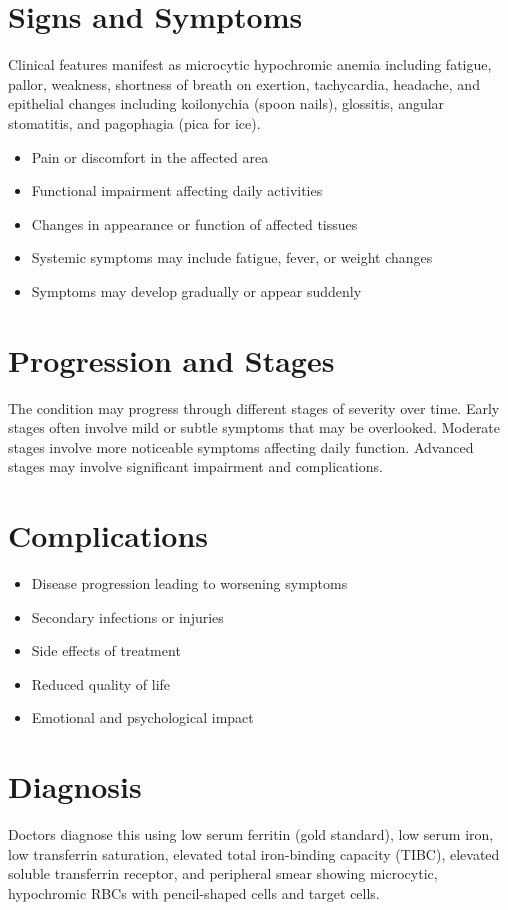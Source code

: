 \section{Signs and Symptoms}
Clinical features manifest as microcytic hypochromic anemia including fatigue, pallor, weakness, shortness of breath on exertion, tachycardia, headache, and epithelial changes including koilonychia (spoon nails), glossitis, angular stomatitis, and pagophagia (pica for ice).

\begin{itemize}[noitemsep]
  \item Pain or discomfort in the affected area
  \item Functional impairment affecting daily activities
  \item Changes in appearance or function of affected tissues
  \item Systemic symptoms may include fatigue, fever, or weight changes
  \item Symptoms may develop gradually or appear suddenly
\end{itemize}
\section{Progression and Stages}
The condition may progress through different stages of severity over time. Early stages often involve mild or subtle symptoms that may be overlooked. Moderate stages involve more noticeable symptoms affecting daily function. Advanced stages may involve significant impairment and complications.
\section{Complications}
\begin{itemize}[noitemsep]
  \item Disease progression leading to worsening symptoms
  \item Secondary infections or injuries
  \item Side effects of treatment
  \item Reduced quality of life
  \item Emotional and psychological impact
\end{itemize}
\section{Diagnosis}
Doctors diagnose this using low serum ferritin (gold standard), low serum iron, low transferrin saturation, elevated total iron-binding capacity (TIBC), elevated soluble transferrin receptor, and peripheral smear showing microcytic, hypochromic RBCs with pencil-shaped cells and target cells.

